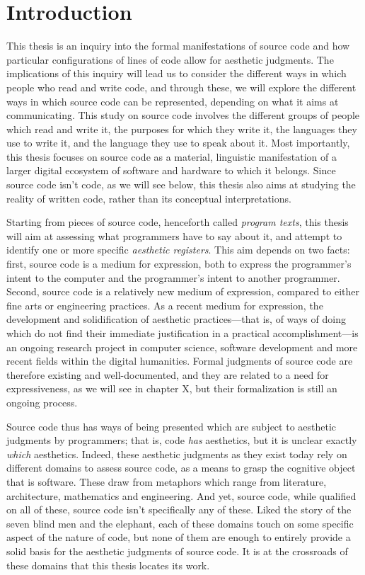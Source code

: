 \section{Introduction}

This thesis is an inquiry into the formal manifestations of source code and how particular configurations of lines of code allow for aesthetic judgments. The implications of this inquiry will lead us to consider the different ways in which people who read and write code, and through these, we will explore the different ways in which source code can be represented, depending on what it aims at communicating.
This study on source code involves the different groups of people which read and write it, the purposes for which they write it, the languages they use to write it, and the language they use to speak about it. Most importantly, this thesis focuses on source code as a material, linguistic manifestation of a larger digital ecosystem of software and hardware to which it belongs. Since source code isn't code, as we will see below, this thesis also aims at studying the reality of written code, rather than its conceptual interpretations.

Starting from pieces of source code, henceforth called \emph{program texts}\cite{detienne_software_2012}, this thesis will aim at assessing what programmers have to say about it, and attempt to identify one or more specific \emph{aesthetic registers}. This aim depends on two facts: first, source code is a medium for expression, both to express the programmer's intent to the computer\cite{dijkstra_chapter_1972} and the programmer's intent to another programmer\cite{abelson_structure_1979}. Second, source code is a relatively new medium of expression, compared to either fine arts or engineering practices. As a recent medium for expression, the development and solidification of aesthetic practices—that is, of ways of doing which do not find their immediate justification in a practical accomplishment—is an ongoing research project in computer science, software development and more recent fields within the digital humanities. Formal judgments of source code are therefore existing and well-documented, and they are related to a need for expressiveness, as we will see in chapter X, but their formalization is still an ongoing process.

Source code thus has ways of being presented which are subject to aesthetic judgments by programmers; that is, code \emph{has} aesthetics, but it is unclear exactly \emph{which} aesthetics. Indeed, these aesthetic judgments as they exist today rely on different domains to assess source code, as a means to grasp the cognitive object that is software. These draw from metaphors which range from literature, architecture, mathematics and engineering. And yet, source code, while qualified on all of these, source code isn't specifically any of these. Liked the story of the seven blind men and the elephant\cite{chun_sourcery_2008}, each of these domains touch on some specific aspect of the nature of code, but none of them are enough to entirely provide a solid basis for the aesthetic judgments of source code. It is at the crossroads of these domains that this thesis locates its work.

